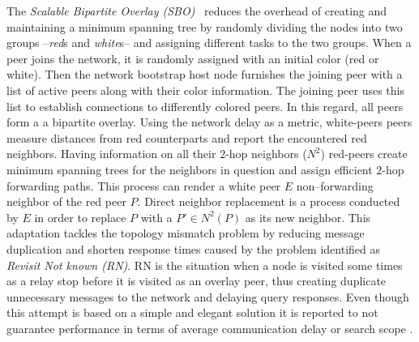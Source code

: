 
The \emph{Scalable Bipartite Overlay (SBO)}~\cite{LXN2007} 
reduces the overhead of creating
and maintaining a minimum spanning tree 
by randomly dividing the nodes into
two groups --\emph{red}s and \emph{white}s-- 
and assigning different tasks to the two groups.
When a peer joins the network, it is randomly assigned with an initial
color (red or white).
Then the network bootstrap host node furnishes the joining peer with a list
of active peers along with their color information. 
The joining peer uses this list to 
establish connections to differently colored peers. 
In this regard, all peers form a a bipartite overlay. 
Using the network delay as a metric, white-peers 
peers measure distances from red counterparts
and report the encountered red neighbors.
Having information on all their $2$-hop neighbors 
($N^2$)
red-peers create minimum spanning trees for the neighbors in question and
assign efficient $2$-hop forwarding paths. This process can render a white
peer $E$ non--forwarding neighbor of the red peer $P$. Direct neighbor
replacement is a process conducted by $E$ in order to replace $P$ with a
$P' \in N^2(P)$ as its new neighbor. This adaptation tackles the
topology mismatch problem by reducing message duplication and shorten response
times caused by the problem identified as \emph{Revisit Not known (RN)}. RN is
the situation when a node is visited some times as a relay stop before it is
visited as an overlay peer, thus creating duplicate unnecessary messages to the
network and delaying query responses.
Even though this attempt is based on a simple and elegant solution it is
reported to not guarantee performance in terms of average communication delay
or search scope \cite{HLH2009}.
%
%
